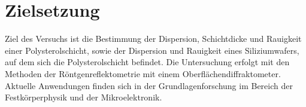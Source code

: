 \section{Zielsetzung}
Ziel des Versuchs ist die Bestimmung der Dispersion, Schichtdicke und Rauigkeit einer Polysterolschicht,
sowie der Dispersion und Rauigkeit eines Siliziumwafers, auf dem sich die Polysterolschicht befindet.
Die Untersuchung erfolgt mit den Methoden der Röntgenreflektometrie mit einem Oberflächendiffraktometer.
Aktuelle Anwendungen finden sich in der Grundlagenforschung im Bereich der Festkörperphysik und der
Mikroelektronik.